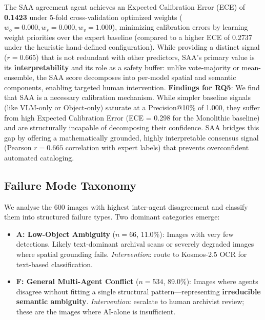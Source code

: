 \documentclass[12pt,onecolumn,a4paper]{IEEEtran}
\begin{document}
The SAA agreement agent achieves an Expected Calibration Error (ECE) of \textbf{0.1423} under 5-fold cross-validation optimized weights ($w_o = 0.000, w_s = 0.000, w_v = 1.000$), minimizing calibration errors by learning weight priorities over the expert baseline (compared to a higher ECE of 0.2737 under the heuristic hand-defined configuration). While providing a distinct signal ($r=0.665$) that is not redundant with other predictors, SAA's primary value is its \textbf{interpretability} and its role as a safety buffer: unlike vote-majority or mean-ensemble, the SAA score decomposes into per-model spatial and semantic components, enabling targeted human intervention. \textbf{Findings for RQ5}: We find that SAA is a necessary calibration mechanism. While simpler baseline signals (like VLM-only or Object-only) saturate at a Precision@10\% of 1.000, they suffer from high Expected Calibration Error (ECE = 0.298 for the Monolithic baseline) and are structurally incapable of decomposing their confidence. SAA bridges this gap by offering a mathematically grounded, highly interpretable consensus signal (Pearson $r=0.665$ correlation with expert labels) that prevents overconfident automated cataloging.



\subsection{Failure Mode Taxonomy}
\label{sec:failure_modes}

We analyse the 600 images with highest inter-agent disagreement and classify them into structured failure types. Two dominant categories emerge:

\begin{itemize}
    \item \textbf{A: Low-Object Ambiguity} ($n = 66$, 11.0\%): Images with very few detections. Likely text-dominant archival scans or severely degraded images where spatial grounding fails. \textit{Intervention}: route to Kosmos-2.5 OCR for text-based classification.
    \item \textbf{F: General Multi-Agent Conflict} ($n = 534$, 89.0\%): Images where agents disagree without fitting a single structural pattern---representing \textbf{irreducible semantic ambiguity}. \textit{Intervention}: escalate to human archivist review; these are the images where AI-alone is insufficient.
\end{itemize}
\end{document}

